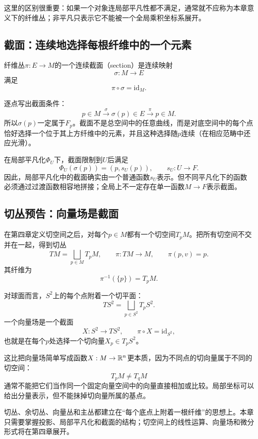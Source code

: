 这里的区别很重要：如果一个对象连局部平凡性都不满足，通常就不应称为本章意义下的纤维丛；非平凡只表示它不能被一个全局乘积坐标系展开。

\subsection{截面：连续地选择每根纤维中的一个元素}

\begin{definition}[截面]
纤维丛$\pi:E\to M$的一个连续截面（section）是连续映射
\[
    \sigma:M\longrightarrow E
\]
满足
\[
    \pi\circ\sigma=\mathrm{id}_M.
\]
\end{definition}

逐点写出截面条件：
\[
    p\in M
    \xrightarrow{\ \sigma\ }\sigma(p)\in E
    \xrightarrow{\ \pi\ }p\in M.
\]
所以$\sigma(p)$一定属于$F_p$。截面不是总空间中的任意曲线，而是对底空间中的每个点恰好选择一个位于其上方纤维中的元素，并且这种选择随$p$连续（在相应范畴中还应光滑）。

在局部平凡化$\Phi_U$下，截面限制到$U$后满足
\[
    \Phi_U(\sigma(p))=(p,s_U(p)),
    \qquad
    s_U:U\to F.
\]
因此，局部平凡化中的截面确实由一个普通函数$s_U$表示。但不同平凡化下的函数必须通过过渡函数相容地拼接；全局上不一定存在单一函数$M\to F$表示截面。

\subsection{切丛预告：向量场是截面}

在第四章定义切空间之后，对每个$p\in M$都有一个切空间$T_pM$。把所有切空间不交并在一起，得到切丛
\[
    TM=\bigsqcup_{p\in M}T_pM,
    \qquad
    \pi:TM\to M,
    \qquad
    \pi(p,v)=p.
\]
其纤维为
\[
    \pi^{-1}(\{p\})=T_pM.
\]

对球面而言，$S^2$上的每个点附着一个切平面：
\[
    TS^2=\bigsqcup_{p\in S^2}T_pS^2.
\]
一个向量场是一个截面
\[
    X:S^2\to TS^2,
    \qquad
    \pi\circ X=\mathrm{id}_{S^2},
\]
也就是在每个$p$处选择一个切向量$X_p\in T_pS^2$。

这比把向量场简单写成函数$X:M\to\mathbb{R}^n$更本质，因为不同点的切向量属于不同的切空间：
\[
    T_pM\neq T_qM
\]
通常不能把它们当作同一个固定向量空间中的向量直接相加或比较。局部坐标可以给出分量表示，但不能抹掉切向量所属的基点。

\begin{remark}[为什么纤维丛先作为预告]
切丛、余切丛、向量丛和主丛都建立在“每个底点上附着一根纤维”的思想上。本章只需要掌握投影、局部平凡化和截面的结构；切空间上的线性运算、向量场和微分形式将在第四章展开。
\end{remark}

